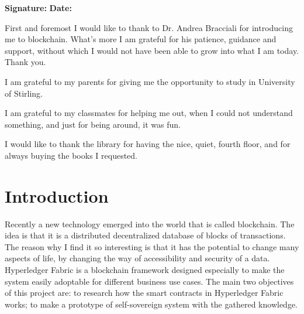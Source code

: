 \documentclass[a4paper,11pt]{report}
\begin{document}
\bigskip

{\bf Signature:} \hspace{20em} {\bf Date:}




First and foremost I would like to thank to Dr. Andrea Bracciali for introducing me to blockchain. What's more I am grateful for his patience, guidance and support, without which I would not have been able to grow into what I am today. Thank you.

I am grateful to my parents for giving me the opportunity to study in University of Stirling. 

I am grateful to my classmates for helping me out, when I could not understand something, and just for being around, it was fun. 

I would like to thank the library for having the nice, quiet, fourth floor, and for always buying the books I requested. 


\tableofcontents

\listoffigures                


\clearpage


\setcounter{page}{1}



\chapter{Introduction}

\label{introduction}

Recently a new technology emerged into the world that is called blockchain. The idea is that it is a distributed decentralized database of blocks of transactions. The reason why I find it so interesting is that it has the potential to change many aspects of life, by changing the way of accessibility and security of a data. Hyperledger Fabric is a blockchain framework designed especially to make the system easily adoptable for different business use cases. The main two objectives of this project are: to research how the smart contracts in Hyperledger Fabric works; to make a prototype of self-sovereign system with the gathered knowledge. 
\end{document}
